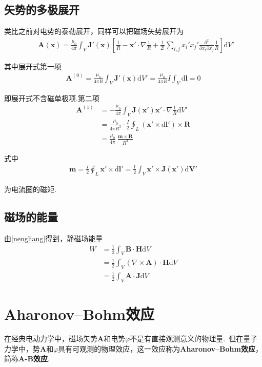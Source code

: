 \documentclass[main.tex]{subfiles}
\begin{document}
\subsection{矢势的多极展开}
类比之前对电势的泰勒展开，同样可以把磁场矢势展开为
\begin{align}
    &\boldsymbol{A}(\boldsymbol{x}) = \frac{\mu _0}{4\pi}\int _{V}\boldsymbol{J}'(\boldsymbol{x})\left[\frac{1}{R} - \boldsymbol{x}'\cdot \nabla \frac{1}{R}+\frac{1}{2!} \sum_{i,j}x_i' x_j' \frac{\partial ^2}{\partial x_i \partial x_j} \frac{1}{R} \right] \mathrm{d}V'
\end{align}

其中展开式第一项
\begin{align}
    \boldsymbol{A}^{(0)} = \frac{\mu _0}{4\pi R}\int _{V}\boldsymbol{J}'(\boldsymbol{x})\mathrm{d}V' = \frac{\mu _0}{4\pi R}I\int _{V}\mathrm{d}\boldsymbol{l} = 0
\end{align}

即展开式不含磁单极项.第二项
\begin{align}
    \boldsymbol{A}^{(1)} &= -\frac{\mu _0}{4\pi}\int _{V} \boldsymbol{J}(\boldsymbol{x}')\boldsymbol{x}'\cdot \nabla \frac{1}{R}\mathrm{d}V'\\
    & = \frac{\mu _0}{4\pi R^3}\cdot \frac{I}{2}\oint _{L}(\boldsymbol{x}' \times \mathrm{d} \boldsymbol{l}')\times \boldsymbol{R}\\
    & = \frac{\mu _0}{4\pi}\  \frac{\boldsymbol{m} \times \boldsymbol{R}}{R^3}
\end{align}

式中
\begin{align}
    \boldsymbol{m} = \frac{I}{2} \oint_{L} \boldsymbol{x}' \times \mathrm{d} \boldsymbol{l}' = \frac{1}{2} \int_{V} \boldsymbol{x}' \times \boldsymbol{J}(\boldsymbol{x}') \mathrm{d} \boldsymbol{V}' 
\end{align}

为电流圈的磁矩.

\subsection{磁场的能量}

由\ref{nengliang}得到，静磁场能量
\begin{align}
    W& = \frac{1}{2}\int_{V}\boldsymbol{B}\cdot \boldsymbol{H} \mathrm{d}V\\
    & = \frac{1}{2}\int_{V} (\nabla \times \boldsymbol{A}) \cdot \boldsymbol{H} \mathrm{d}V\\
    & = \frac{1}{2}\int_{V}\boldsymbol{A}\cdot \boldsymbol{J} \mathrm{d}V
\end{align}

\section{Aharonov–Bohm效应}
在经典电动力学中，磁场矢势$\boldsymbol{A}$和电势$\varphi$不是有直接观测意义的物理量.\ 但在量子力学中，势$\boldsymbol{A}$和$\varphi$具有可观测的物理效应，这一效应称为\textbf{Aharonov–Bohm效应}，简称\textbf{A-B效应}.
\end{document}
